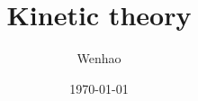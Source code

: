 \documentclass{article}
\begin{document}
\title{Kinetic theory}
\author{Wenhao}
\date{\today}
\maketitle
\end{document}
